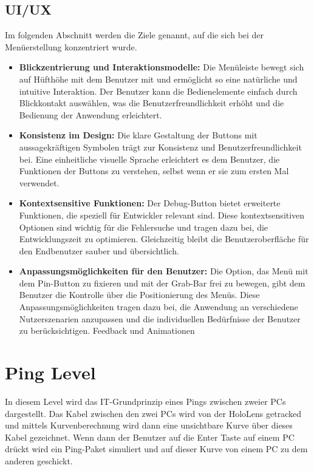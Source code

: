 \subsection{UI/UX}
Im folgenden Abschnitt werden die Ziele genannt, auf die sich bei der Menüerstellung konzentriert wurde.
\begin{itemize}
\item \textbf{Blickzentrierung und Interaktionsmodelle:}
Die Menüleiste bewegt sich auf Hüfthöhe mit dem Benutzer mit und ermöglicht so eine natürliche und intuitive Interaktion.
Der Benutzer kann die Bedienelemente einfach durch Blickkontakt auswählen, was die Benutzerfreundlichkeit erhöht und die
Bedienung der Anwendung erleichtert.
\item \textbf{Konsistenz im Design:}
Die klare Gestaltung der Buttons mit aussagekräftigen Symbolen trägt zur Konsistenz und Benutzerfreundlichkeit bei.
Eine einheitliche visuelle Sprache erleichtert es dem Benutzer, die Funktionen der Buttons zu verstehen, selbst wenn er
sie zum ersten Mal verwendet.
\item \textbf{Kontextsensitive Funktionen:}
Der Debug-Button bietet erweiterte Funktionen, die speziell für Entwickler relevant sind. Diese kontextsensitiven
Optionen sind wichtig für die Fehlersuche und tragen dazu bei, die Entwicklungszeit zu optimieren. Gleichzeitig bleibt
die Benutzeroberfläche für den Endbenutzer sauber und übersichtlich.
\item \textbf{Anpassungsmöglichkeiten für den Benutzer:}
Die Option, das Menü mit dem Pin-Button zu fixieren und mit der Grab-Bar frei zu bewegen, gibt dem Benutzer die
Kontrolle über die Positionierung des Menüs. Diese Anpassungsmöglichkeiten tragen dazu bei, die Anwendung an
verschiedene Nutzerszenarien anzupassen und die individuellen Bedürfnisse der Benutzer zu berücksichtigen.
Feedback und Animationen
\end{itemize}

\section{Ping Level}
In diesem Level wird das IT-Grundprinzip eines Pings zwischen zweier
PCs dargestellt. Das Kabel zwischen den zwei PCs wird von der
HoloLens getracked und mittels Kurvenberechnung wird dann eine
unsichtbare Kurve über dieses Kabel gezeichnet. Wenn dann der Benutzer
auf die Enter Taste auf einem PC drückt wird ein Ping-Paket simuliert
und auf dieser Kurve von einem PC zu dem anderen geschickt.

